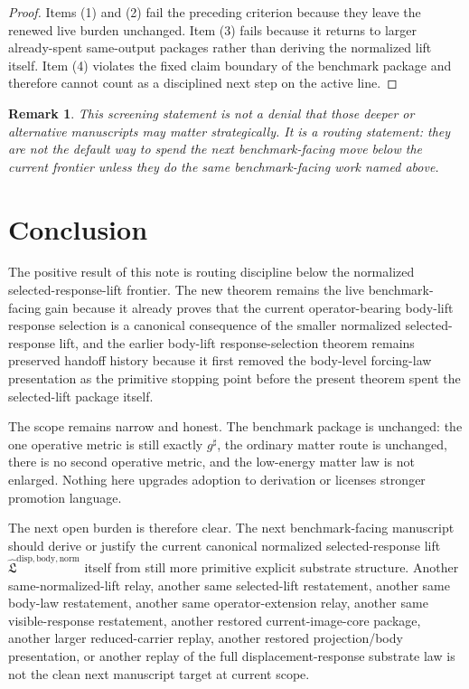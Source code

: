 \documentclass[11pt]{article}
\newcommand{\CompletedMetric}{g^{\sharp}}
\newcommand{\NormalizedLiftPackage}{\widehat{\mathfrak L}^{\mathrm{disp,body,norm}}}
\newtheorem{remark}{Remark}
\begin{document}
\begin{proof}
Items (1) and (2) fail the preceding criterion because they leave the renewed live burden unchanged. Item (3) fails because it returns to larger already-spent same-output packages rather than deriving the normalized lift itself. Item (4) violates the fixed claim boundary of the benchmark package and therefore cannot count as a disciplined next step on the active line.
\end{proof}

\begin{remark}
This screening statement is not a denial that those deeper or alternative manuscripts may matter strategically. It is a routing statement: they are not the default way to spend the next benchmark-facing move below the current frontier unless they do the same benchmark-facing work named above.
\end{remark}

\section{Conclusion}

The positive result of this note is routing discipline below the normalized selected-response-lift frontier. The new theorem remains the live benchmark-facing gain because it already proves that the current operator-bearing body-lift response selection is a canonical consequence of the smaller normalized selected-response lift, and the earlier body-lift response-selection theorem remains preserved handoff history because it first removed the body-level forcing-law presentation as the primitive stopping point before the present theorem spent the selected-lift package itself.

The scope remains narrow and honest. The benchmark package is unchanged: the one operative metric is still exactly \(\CompletedMetric\), the ordinary matter route is unchanged, there is no second operative metric, and the low-energy matter law is not enlarged. Nothing here upgrades adoption to derivation or licenses stronger promotion language.

The next open burden is therefore clear. The next benchmark-facing manuscript should derive or justify the current canonical normalized selected-response lift \(\NormalizedLiftPackage\) itself from still more primitive explicit substrate structure. Another same-normalized-lift relay, another same selected-lift restatement, another same body-law restatement, another same operator-extension relay, another same visible-response restatement, another restored current-image-core package, another larger reduced-carrier replay, another restored projection/body presentation, or another replay of the full displacement-response substrate law is not the clean next manuscript target at current scope.
\end{document}
